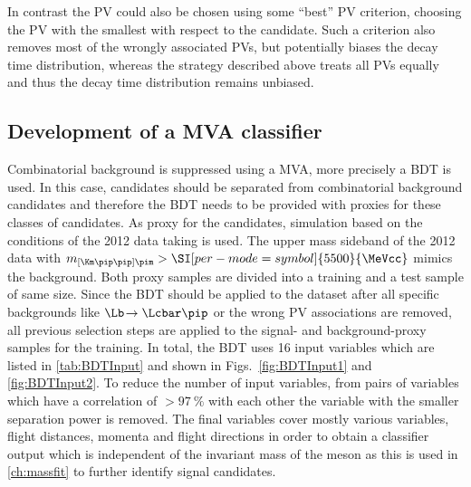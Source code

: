 In contrast the \ac{PV} could also be chosen using some \enquote{best} \ac{PV} criterion, \eg choosing the \ac{PV} with the smallest \chisqip with respect to the \Bz candidate.
Such a criterion also removes most of the wrongly associated \ac{PV}s, but potentially biases the decay time distribution, whereas the strategy described above treats all \ac{PV}s equally and thus the decay time distribution remains unbiased.

\subsection{Development of a MVA classifier}
\label{sec:MVADev}

Combinatorial background is suppressed using a \ac{MVA}, more precisely a \ac{BDT} is used.
In this case, \BdToDpi candidates should be separated from combinatorial background candidates and therefore the BDT needs to be provided with proxies for these classes of candidates.
As proxy for the \BdToDpi candidates, simulation based on the conditions of the \num{2012} data taking is used.
The upper mass sideband of the \num{2012} data with $m_{\left[\Km\pip\pip\right]\pim}>\SI[per-mode=symbol]{5500}{\MeVcc}$ mimics the background.
Both proxy samples are divided into a training and a test sample of same size.
Since the \ac{BDT} should be applied to the dataset after all specific backgrounds like $\Lb\!\to\Lcbar\pip$ or the wrong PV associations are removed, all previous selection steps are applied to the signal- and background-proxy samples for the training.
In total, the \ac{BDT} uses \num{16} input variables which are listed in \cref{tab:BDTInput} and shown in Figs.~\ref{fig:BDTInput1} and \ref{fig:BDTInput2}.
To reduce the number of input variables, from pairs of variables which have a correlation of $>\SI{97}{\percent}$ with each other the variable with the smaller separation power is removed.
The final variables cover mostly various \chisqip variables, flight distances, momenta and flight directions in order to obtain a classifier output which is independent of the invariant mass of the \Bz meson as this is used in \cref{ch:massfit} to further identify signal candidates.

